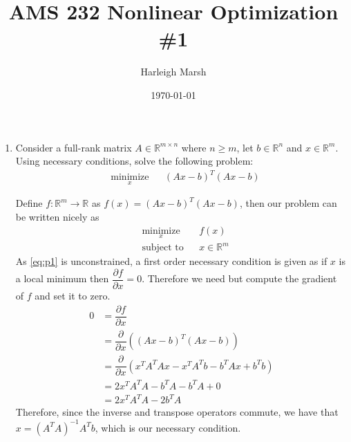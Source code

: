\documentclass[10pt]{article}
\newcommand{\libzptrl}[2]{\dfrac{\partial #1}{\partial #2} }
\newcommand{\inv}{^{-1}}
\newcommand{\paren}[1]{\!\left(#1\right)\!}
\newcommand{\bbr}{\mathbb{R}}
\begin{document}
    \title{AMS 232 Nonlinear Optimization \#1}
    \author{Harleigh Marsh}
    \date{\today}
    \maketitle


\begin{enumerate}[leftmargin=*]
  \item Consider a full-rank matrix $A\in\bbr^{m\times n}$ where $n\ge m$, let $b\in\bbr^n$ and $x\in\bbr^m$.  Using necessary conditions, solve the following problem:
      \begin{equation*}
        \begin{aligned}
            & \underset{x}{\text{minimize}}
            & & (Ax-b)^T(Ax-b)
        \end{aligned}
      \end{equation*}

      Define $f:\bbr^m\longrightarrow\bbr$ as $f(x)=(Ax-b)^T(Ax-b)$, then our problem can be written nicely as
      \begin{equation} \label{eq:p1}
        \begin{aligned}
        & \underset{x}{\text{minimize}}
        & & f(x) \\
        & \text{subject to}
        & & x\in\bbr^m
        \end{aligned}
      \end{equation}
      As \ref{eq:p1} is unconstrained, a first order necessary condition is given as if $x$ is a local minimum then $\libzptrl{f}{x}=0$.  Therefore we need but compute the gradient of $f$ and set it to zero.
      \begin{align*}
         0 &= \libzptrl{f}{x}\\
           &= \libzptrl{}{x}\paren{(Ax-b)^T(Ax-b)}\\
           &= \libzptrl{}{x}\paren{ x^TA^TAx - x^TA^Tb-b^TAx + b^Tb }\\
           &= 2x^TA^TA - b^TA - b^TA + 0\\
           &= 2x^TA^TA - 2b^TA
      \end{align*}
      Therefore, since the inverse and transpose operators commute, we have that $x=(A^TA)\inv A^Tb$, which is our necessary condition.


\end{enumerate}
\end{document}

